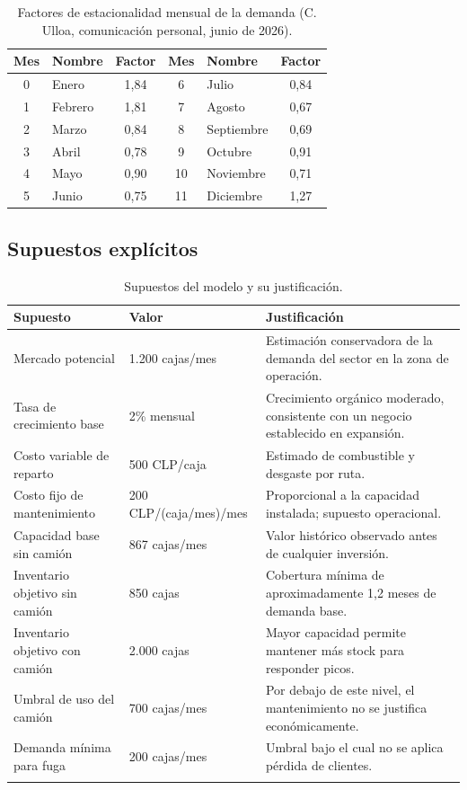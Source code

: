 \documentclass[10pt,a4paper]{article}
\begin{document}
\begin{table}[H]
\centering
\begin{tabular}{clc|clc}
\toprule
Mes & Nombre & Factor & Mes & Nombre & Factor \\
\midrule
0 & Enero    & 1,84 & 6  & Julio      & 0,84 \\
1 & Febrero  & 1,81 & 7  & Agosto     & 0,67 \\
2 & Marzo    & 0,84 & 8  & Septiembre & 0,69 \\
3 & Abril    & 0,78 & 9  & Octubre    & 0,91 \\
4 & Mayo     & 0,90 & 10 & Noviembre  & 0,71 \\
5 & Junio    & 0,75 & 11 & Diciembre  & 1,27 \\
\bottomrule
\end{tabular}
\caption{Factores de estacionalidad mensual de la demanda (C. Ulloa, comunicación personal, junio de 2026).}
\end{table}

\subsection{Supuestos explícitos}

\begin{longtable}{p{5cm} p{3.5cm} p{5.5cm}}
\toprule
Supuesto & Valor & Justificación \\
\midrule
\endhead
Mercado potencial & 1.200 cajas/mes & Estimación conservadora de la demanda del sector en la zona de operación. \\
Tasa de crecimiento base & 2\% mensual & Crecimiento orgánico moderado, consistente con un negocio establecido en expansión. \\
Costo variable de reparto & 500 CLP/caja & Estimado de combustible y desgaste por ruta. \\
Costo fijo de mantenimiento & 200 CLP/(caja/mes)/mes & Proporcional a la capacidad instalada; supuesto operacional. \\
Capacidad base sin camión & 867 cajas/mes & Valor histórico observado antes de cualquier inversión. \\
Inventario objetivo sin camión & 850 cajas & Cobertura mínima de aproximadamente 1,2 meses de demanda base. \\
Inventario objetivo con camión & 2.000 cajas & Mayor capacidad permite mantener más stock para responder picos. \\
Umbral de uso del camión & 700 cajas/mes & Por debajo de este nivel, el mantenimiento no se justifica económicamente. \\
Demanda mínima para fuga & 200 cajas/mes & Umbral bajo el cual no se aplica pérdida de clientes. \\
\bottomrule
\caption{Supuestos del modelo y su justificación.}
\end{longtable}
\end{document}
